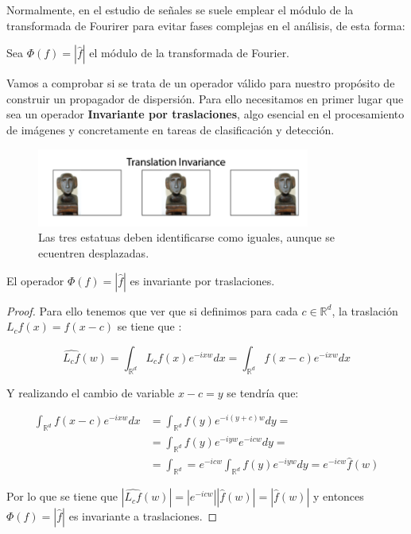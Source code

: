 \noindent Normalmente, en el estudio de señales se suele emplear el módulo de la transformada de Fourirer para evitar fases complejas en el análisis, de esta forma: 

\begin{definicion}
Sea $\Phi(f)=|\widehat{f}|$ el módulo de la transformada de Fourier. 
\end{definicion}

\noindent Vamos a comprobar si se trata de un operador válido para nuestro propósito de construir un propagador de dispersión. Para ello necesitamos en primer lugar que sea un operador \textbf{Invariante por traslaciones}, algo esencial en el procesamiento de imágenes y concretamente en tareas de clasificación y detección. 

\begin{figure} [!h]
    \centering
    \includegraphics[width=0.8\textwidth]{img/translation_invariance.png}
    \caption{Las tres estatuas deben identificarse como iguales, aunque se ecuentren desplazadas.}
    \label{fig:invarianza_traslaciones}
\end{figure}

\medskip

\begin{lema}
    El operador $\Phi(f)=|\widehat{f}|$ es invariante por traslaciones.
\end{lema}

\begin{proof}
    \noindent Para ello tenemos que ver que si definimos para cada $c \in \mathbb{R}^d$, la traslación $L_cf(x)=f(x-c)$ se tiene que :  
    
    $$\widehat{L_cf}(w)=\int_{\mathbb{R}^d}{L_cf(x) e^{-ixw} dx}=\int_{\mathbb{R}^d}{f(x-c)e^{-ixw}dx}$$
    
    \noindent Y realizando el cambio de variable $x-c=y$ se tendría que: 
    
    \begin{align*}
        \int_{\mathbb{R}^d}{f(x-c)e^{-ixw}dx} &= \int_{\mathbb{R}^d}{f(y)e^{-i(y+c)w}dy}= \\      &=\int_{\mathbb{R}^d}{f(y)e^{-iyw}e^{-icw}dy}= \\ &=\int_{\mathbb{R}^d}=e^{-icw}\int_{\mathbb{R}^d}{f(y)e^{-iyw}dy}=e^{-icw}\widehat{f}(w)
    \end{align*}
    
    \noindent Por lo que se tiene que $|\widehat{L_cf}(w)|=|e^{-icw}| |\widehat{f}(w)|=|\widehat{f}(w)|$ y entonces $\Phi(f)=|\widehat{f}|$ es invariante a traslaciones. \qedhere
\end{proof}

